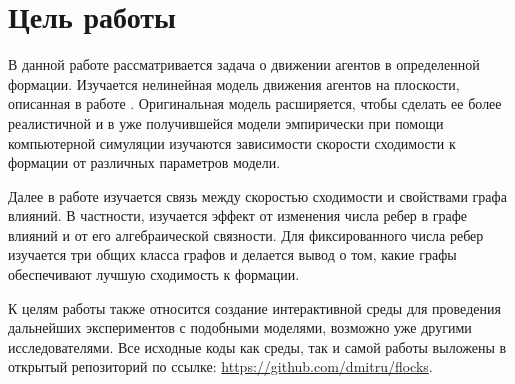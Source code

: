 
\chapter{Цель работы}
В данной работе рассматривается задача о движении агентов в определенной формации. Изучается нелинейная модель движения агентов на плоскости, описанная в работе \cite{veerman2005flocks}. Оригинальная модель расширяется, чтобы сделать ее более реалистичной и в уже получившейся модели эмпирически при помощи компьютерной симуляции изучаются зависимости скорости сходимости к формации от различных параметров модели. 

Далее в работе изучается связь между скоростью сходимости и свойствами графа влияний. В частности, изучается эффект от изменения числа ребер в графе влияний и от его алгебраической связности. Для фиксированного числа ребер изучается три общих класса графов и делается вывод о том, какие графы обеспечивают лучшую сходимость к формации.

К целям работы также относится создание интерактивной среды для проведения дальнейших экспериментов с подобными моделями, возможно уже другими исследователями. Все исходные коды как среды, так и самой работы выложены в открытый репозиторий по ссылке:
\url{https://github.com/dmitru/flocks}.

\clearpage